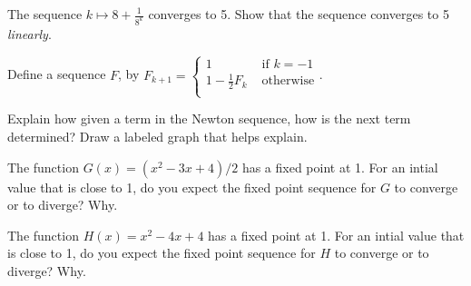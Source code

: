 \documentclass[12pt,fleqn]{exam}
\begin{document}
\begin{questions}
\question[5]  The sequence  \(\displaystyle k \mapsto 8 + \frac{1}{8^k} \) converges to 5. Show that the sequence 
 converges to 5 \emph{linearly}.


\begin{solution}%

\end{solution}



\question Define a sequence \(F\), by \(F_{k+1} = \begin{cases}  1  & \mbox{ if } k =-1  \\  1 - \frac{1}{2} F_k   & \mbox{ otherwise} \\  \end{cases} \).




\question [5]  Explain how given a term  in the Newton  sequence, how is the next term determined?  Draw a labeled graph that helps explain.
\begin{solution}%

\end{solution}
\question The function \(G(x) = (x^2 - 3 x + 4)/2 \) has a fixed point at 1.  For an intial value that is close to 1, do you expect the fixed point sequence for \(G\) to converge or to diverge?  Why.

\question The function \(H(x) = x^2 - 4 x + 4 \) has a fixed point at 1.  For an intial value that is close to 1, do you expect the fixed point sequence for \(H\) to converge or to diverge?  Why.



\end{questions}
\end{document}
